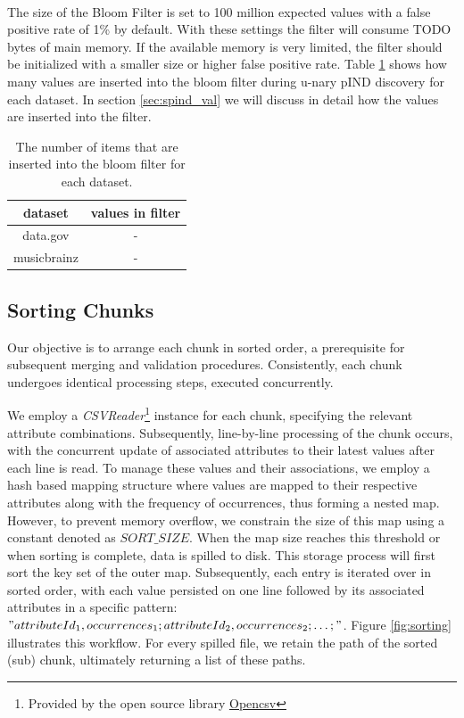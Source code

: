 \noindent \\ The size of the Bloom Filter is set to 100 million expected values with a false positive rate of 1\% by default. With these settings the filter will consume TODO bytes of main memory. If the available memory is very limited, the filter should be initialized with a smaller size or higher false positive rate. Table \ref{tab:filter} shows how many values are inserted into the bloom filter during u-nary pIND discovery for each dataset. In section \ref{sec:spind_val} we will discuss in detail how the values are inserted into the filter.

\begin{table}
    \begin{tabular}{c|c}
     dataset & values in filter\\ 
     \hline\hline
     data.gov & - \\ 
     \hline
     musicbrainz & - \\
    \end{tabular}
    \caption{The number of items that are inserted into the bloom filter for each dataset.} \label{tab:filter}
\end{table}


\subsection{Sorting Chunks}
Our objective is to arrange each chunk in sorted order, a prerequisite for subsequent merging and validation procedures. Consistently, each chunk undergoes identical processing steps, executed concurrently.

We employ a \textit{CSVReader}\footnote{Provided by the open source library \href{https://opencsv.sourceforge.net/}{Opencsv}} instance for each chunk, specifying the relevant attribute combinations. Subsequently, line-by-line processing of the chunk occurs, with the concurrent update of associated attributes to their latest values after each line is read. To manage these values and their associations, we employ a hash based mapping structure where values are mapped to their respective attributes along with the frequency of occurrences, thus forming a nested map. However, to prevent memory overflow, we constrain the size of this map using a constant denoted as $SORT\_SIZE$. When the map size reaches this threshold or when sorting is complete, data is spilled to disk. This storage process will first sort the key set of the outer map. Subsequently, each entry is iterated over in sorted order, with each value persisted on one line followed by its associated attributes in a specific pattern: $"attributeId_1,occurrences_1;attributeId_2,occurrences_2;\dots;"$. Figure \ref{fig:sorting} illustrates this workflow. For every spilled file, we retain the path of the sorted (sub) chunk, ultimately returning a list of these paths.


